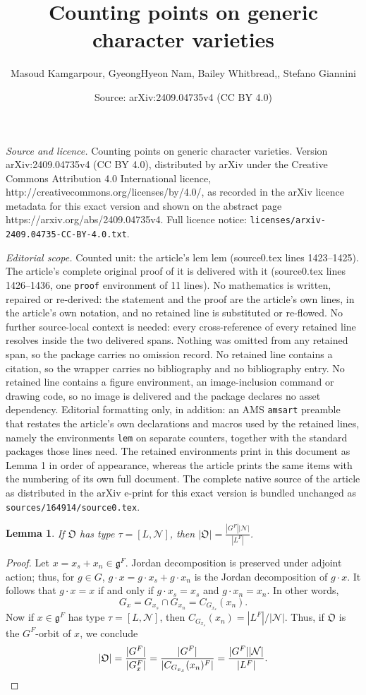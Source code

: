 \documentclass[10pt,a4paper]{amsart}
\title{Counting points on generic character varieties}
\author{Masoud Kamgarpour, GyeongHyeon Nam, Bailey Whitbread,, Stefano Giannini}
\date{Source: arXiv:2409.04735v4 (CC BY 4.0)}
\newtheorem{lem}{Lemma}
\newcommand{\cN}{\mathcal{N}}
\newcommand{\fg}{\mathfrak{g}}
\begin{document}
\maketitle

\noindent\emph{Source and licence.} Counting points on generic character varieties. Version arXiv:2409.04735v4 (CC BY 4.0), distributed by arXiv under the Creative Commons Attribution 4.0 International licence, http://creativecommons.org/licenses/by/4.0/, as recorded in the arXiv licence metadata for this exact version and shown on the abstract page https://arxiv.org/abs/2409.04735v4. Full licence notice: \texttt{licenses/arxiv-2409.04735-CC-BY-4.0.txt}.\par\smallskip

\noindent\textit{Editorial scope.} Counted unit: the article's lem lem (source0.tex lines 1423--1425). The article's complete original proof of it is delivered with it (source0.tex lines 1426--1436, one \texttt{proof} environment of 11 lines). No mathematics is written, repaired or re-derived: the statement and the proof are the article's own lines, in the article's own notation, and no retained line is substituted or re-flowed.  No further source-local context is needed: every cross-reference of every retained line resolves inside the two delivered spans.  Nothing was omitted from any retained span, so the package carries no omission record.  No retained line contains a citation, so the wrapper carries no bibliography and no bibliography entry.  No retained line contains a figure environment, an image-inclusion command or drawing code, so no image is delivered and the package declares no asset dependency.  Editorial formatting only, in addition: an AMS \texttt{amsart} preamble that restates the article's own declarations and macros used by the retained lines, namely the environments \texttt{lem} on separate counters, together with the standard packages those lines need.  The retained environments print in this document as Lemma 1 in order of appearance, whereas the article prints the same items with the numbering of its own full document.  The complete native source of the article as distributed in the arXiv e-print for this exact version is bundled unchanged as \texttt{sources/164914/source0.tex}.
\begin{lem} If $\mathfrak{O}$ has type $\tau=[L,\cN]$, then 
$\displaystyle |\mathfrak{O}| =\frac{|G^F||\cN|}{|L^F|}$. 
\end{lem} 

\begin{proof} 
Let $x=x_s+x_n\in \fg^F$.  Jordan decomposition is preserved under adjoint action; thus, for $g\in G$, $g\cdot x=g\cdot x_s+g\cdot x_n$ is the Jordan decomposition of $g\cdot x$. It follows that  $g\cdot x=x$ if and only if $g\cdot x_s=x_s$ and $g\cdot x_n=x_n$. In other words,  
\[
G_x=G_{x_s}\cap G_{x_n} = C_{G_{x_s}}(x_n).
\]
 Now if $x\in \fg^F$ has type $\tau=[L,\cN]$, then 
$C_{G_{x_s}}(x_n)=|L^F|/|\cN|$. Thus, if $\mathfrak{O}$ is the $G^F$-orbit of $x$, we conclude 
\[
|\mathfrak{O}| = \frac{|G^F|}{|G_{x}^F|}=\frac{|G^F|}{|C_{G_{x_s}}(x_n)^F|}=\frac{|G^F||\cN|}{|L^F|}. \qedhere
\]
\end{proof} 
\end{document}
